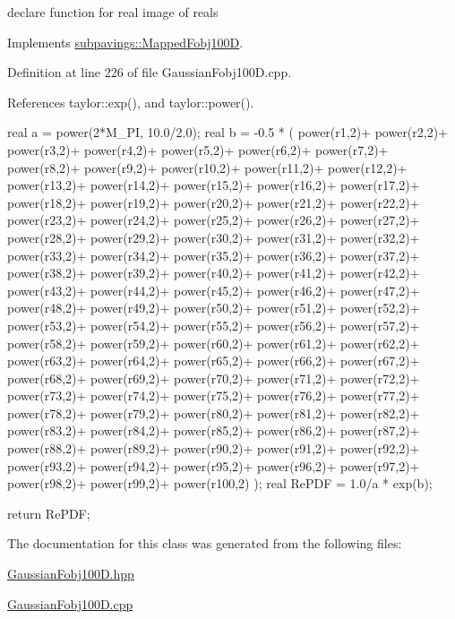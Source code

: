 declare function for real image of reals 



\-Implements \hyperlink{classsubpavings_1_1MappedFobj100D_a6623df51bcbb3ed9ddb9d7e7e38b96eb}{subpavings\-::\-Mapped\-Fobj100\-D}.



\-Definition at line 226 of file \-Gaussian\-Fobj100\-D.\-cpp.



\-References taylor\-::exp(), and taylor\-::power().


\begin{DoxyCode}
{
    real a = power(2*M_PI, 10.0/2.0);
    real b = -0.5 * (   power(r1,2)+
    power(r2,2)+
    power(r3,2)+
    power(r4,2)+
    power(r5,2)+
    power(r6,2)+
    power(r7,2)+
    power(r8,2)+
    power(r9,2)+
    power(r10,2)+
    power(r11,2)+
    power(r12,2)+
    power(r13,2)+
    power(r14,2)+
    power(r15,2)+
    power(r16,2)+
    power(r17,2)+
    power(r18,2)+
    power(r19,2)+
    power(r20,2)+
    power(r21,2)+
    power(r22,2)+
    power(r23,2)+
    power(r24,2)+
    power(r25,2)+
    power(r26,2)+
    power(r27,2)+
    power(r28,2)+
    power(r29,2)+
    power(r30,2)+
    power(r31,2)+
    power(r32,2)+
    power(r33,2)+
    power(r34,2)+
    power(r35,2)+
    power(r36,2)+
    power(r37,2)+
    power(r38,2)+
    power(r39,2)+
    power(r40,2)+
    power(r41,2)+
    power(r42,2)+
    power(r43,2)+
    power(r44,2)+
    power(r45,2)+
    power(r46,2)+
    power(r47,2)+
    power(r48,2)+
    power(r49,2)+
    power(r50,2)+
    power(r51,2)+
    power(r52,2)+
    power(r53,2)+
    power(r54,2)+
    power(r55,2)+
    power(r56,2)+
    power(r57,2)+
    power(r58,2)+
    power(r59,2)+
    power(r60,2)+
    power(r61,2)+
    power(r62,2)+
    power(r63,2)+
    power(r64,2)+
    power(r65,2)+
    power(r66,2)+
    power(r67,2)+
    power(r68,2)+
    power(r69,2)+
    power(r70,2)+
    power(r71,2)+
    power(r72,2)+
    power(r73,2)+
    power(r74,2)+
    power(r75,2)+
    power(r76,2)+
    power(r77,2)+
    power(r78,2)+
    power(r79,2)+
    power(r80,2)+
    power(r81,2)+
    power(r82,2)+
    power(r83,2)+
    power(r84,2)+
    power(r85,2)+
    power(r86,2)+
    power(r87,2)+
    power(r88,2)+
    power(r89,2)+
    power(r90,2)+
    power(r91,2)+
    power(r92,2)+
    power(r93,2)+
    power(r94,2)+
    power(r95,2)+
    power(r96,2)+
    power(r97,2)+
    power(r98,2)+
    power(r99,2)+
    power(r100,2)
    );
    real RePDF = 1.0/a * exp(b);
    
    return RePDF;
}
\end{DoxyCode}


\-The documentation for this class was generated from the following files\-:\begin{DoxyCompactItemize}
\item 
\hyperlink{GaussianFobj100D_8hpp}{\-Gaussian\-Fobj100\-D.\-hpp}\item 
\hyperlink{GaussianFobj100D_8cpp}{\-Gaussian\-Fobj100\-D.\-cpp}\end{DoxyCompactItemize}

